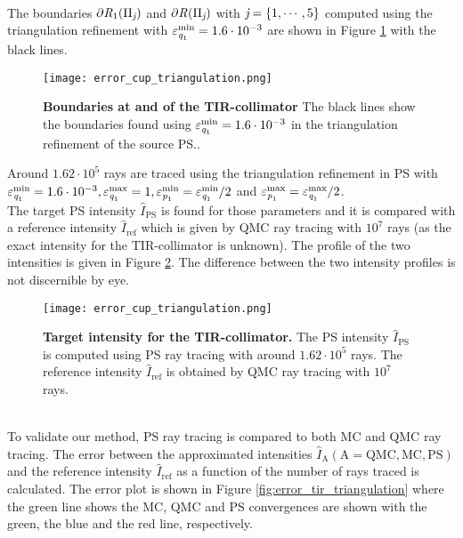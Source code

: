 \\ \indent The boundaries $\partial\mbox{$\emph{R}_{\textit{$1$}}$}(\Pi_{\textit{j}})$ and $\partial\mbox{$\emph{R}_{\textit{}}$}(\Pi_{\textit{j}})$ with $\textit{j} = \{1, \cdots, 5\}$ computed using the triangulation refinement with 
$\varepsilon_{\textit{q}_1}^{\textrm{min}}=1.6\cdot 10^{-3}$ are shown in Figure \ref{fig:boundaries_TIR_triangulation} with the black lines. 
 \begin{figure}[ht]
  \center
  \texttt{[image: error\_cup\_triangulation.png]}
  \caption{\textbf{Boundaries at  and  of the TIR-collimator} The black lines show the boundaries found using $\varepsilon_{\textit{q}_1}^{\textrm{min}}=1.6\cdot 10^{-3}$ in the triangulation refinement of the source PS..}
  \label{fig:boundaries_TIR_triangulation}
\end{figure}
Around $1.62 \cdot 10^5$ rays are traced using the triangulation refinement in PS with $\varepsilon_{\textit{q}_1}^{\textrm{min}}=1.6\cdot 10^{-3}, \varepsilon_{\textit{q}_1}^{\textrm{max}}=1, \varepsilon_{\textit{p}_1}^{\textrm{min}}=\varepsilon_{\textit{q}_1}^{\textrm{min}}/2$ and $\varepsilon_{\textit{p}_1}^{\textrm{max}} = \varepsilon_{\textit{q}_1}^{\textrm{max}}/2$. \\ \indent 
The target PS intensity $\hat{I}_{\textrm{PS}}$ is found for those parameters and it is compared with a reference intensity $\hat{I}_{\textrm{ref}}$ which is given by QMC ray tracing with $10^7$ rays (as the exact intensity for the TIR-collimator is unknown). The profile of the two intensities is given in Figure \ref{fig:intensity_tir_triangulation}. 
The difference between the two intensity profiles is not discernible by eye.
 \begin{figure}[ht]
  \center
  \texttt{[image: error\_cup\_triangulation.png]}
  \caption{\textbf{Target intensity for the TIR-collimator.} The PS intensity $\hat{I}_{\textrm{PS}}$ is computed using PS ray tracing with around $1.62\cdot 10^5$ rays. The reference intensity $\hat{I}_{\textrm{ref}}$ is obtained by QMC ray tracing with $10^7$ rays.}
  \label{fig:intensity_tir_triangulation}
\end{figure}
\\ \indent
To validate our method, PS ray tracing is compared to both MC and QMC ray tracing. The error between the approximated intensities $\hat{I}_{\textrm{A}} (\textrm{A}=\textrm{QMC}, \textrm{MC}, \textrm{PS})$ and the reference intensity $\hat{I}_{\textrm{ref}}$ as a function of the number of rays traced is calculated. The error plot is shown in Figure \ref{fig:error_tir_triangulation} where the green line shows the MC, QMC and PS convergences are shown with the green, the blue and the red line, respectively. 
